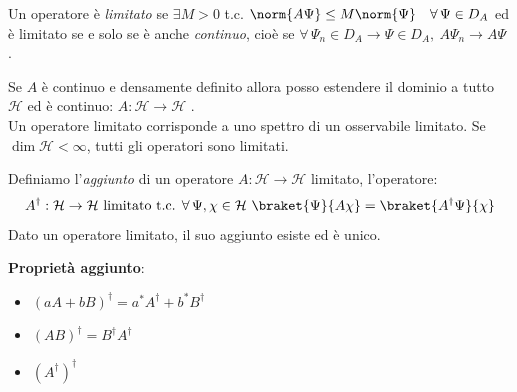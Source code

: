 \begin{definition}
    Un operatore è \textit{limitato} se \(\exists M >0 \) t.c. \(\norm{A\Psi} \leq M \norm{\Psi}\quad \forall\, \Psi \in D_A\)
    ed è limitato se e solo se è anche \textit{continuo}, cioè se \(\forall\, \Psi_n \in D_A\to \Psi \in D_A, \ A\Psi_n \to A \Psi\) .
\end{definition}

Se \(A\) è continuo e densamente definito allora posso estendere il dominio a tutto \(\mathcal{H}\) ed è continuo: \(A : \mathcal{H}\to \mathcal{H}\) . \\
Un operatore limitato corrisponde a uno spettro di un osservabile limitato.
Se \(\operatorname{dim}\mathcal{H} < \infty\), tutti gli operatori sono limitati. 

\begin{definition}
    Definiamo l'\textit{aggiunto} di un operatore \(A: \mathcal{H}\to \mathcal{H}\) limitato, l'operatore:
    \begin{equation}
        A^\dagger: \mathcal{H}\to \mathcal{H} \text{ limitato t.c. } 
        \forall \,\Psi, \chi \in \mathcal{H}\ \braket{\Psi}{A\chi} = \braket{A^\dagger\Psi}{\chi}
    \end{equation}
    Dato un operatore limitato, il suo aggiunto esiste ed è unico.
\end{definition}

\textbf{Proprietà aggiunto}:
\begin{itemize}
    \item \((aA+ bB)^\dagger= a^*A^\dagger + b^*B^\dagger \)
    \item \((AB)^\dagger= B^\dagger A^\dagger\)
    \item \((A^\dagger)^\dagger\)
\end{itemize}


